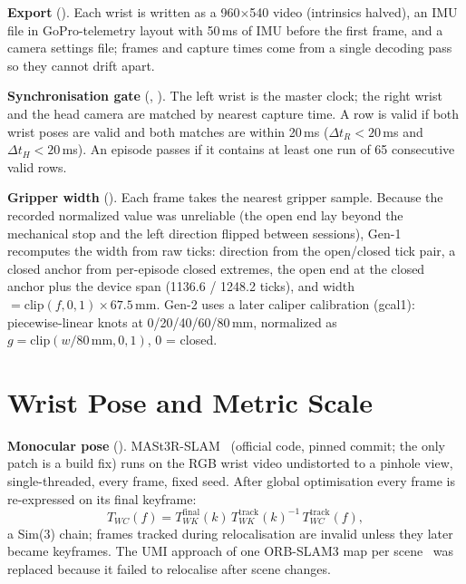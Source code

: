 \documentclass[conference,10pt]{IEEEtran}
\newcommand{\mm}{\,mm\xspace}
\begin{document}
\textbf{Export} (). Each wrist is written as a 960$\times$540 video (intrinsics
halved), an IMU file in GoPro-telemetry layout with 50\,ms of IMU before the first frame, and a camera settings file; frames and
capture times come from a single decoding pass so they cannot drift apart.

\textbf{Synchronisation gate} (, ). The left wrist is the master
clock; the right wrist and the head camera are matched by nearest capture time. A row is valid if both wrist poses are valid and
both matches are within 20\,ms ($\Delta t_R<20$\,ms and $\Delta t_H<20$\,ms). An episode passes if it contains at
least one run of 65 consecutive valid rows.

\textbf{Gripper width} (). Each frame takes the nearest gripper sample. Because the recorded normalized value
was unreliable (the open end lay beyond the mechanical stop and the left direction flipped between sessions), Gen-1 recomputes
the width from raw ticks: direction from the open/closed tick pair, a closed anchor from per-episode closed extremes, the open end
at the closed anchor plus the device span (1136.6 / 1248.2 ticks), and width $= \mathrm{clip}(f,0,1)\times 67.5$\mm. Gen-2 uses a
later caliper calibration (gcal1): piecewise-linear knots at 0/20/40/60/80\mm, normalized as $g=\mathrm{clip}(w/80\,\text{mm},0,1)$,
0 = closed.

\section{Wrist Pose and Metric Scale}\label{sec:pose}
\textbf{Monocular pose} (). MASt3R-SLAM~\cite{murai2025mast3rslam} (official
code, pinned commit; the only patch is a build fix) runs on the RGB wrist video undistorted to a pinhole view, single-threaded,
every frame, fixed seed. After global optimisation every frame is re-expressed on its final keyframe:
\begin{equation}
T_{WC}(f) = T_{WK}^{\text{final}}(k)\,T_{WK}^{\text{track}}(k)^{-1}\,T_{WC}^{\text{track}}(f),
\end{equation}
a Sim(3) chain; frames tracked during relocalisation are invalid unless they later became keyframes. The UMI approach of one
ORB-SLAM3 map per scene~\cite{chi2024umi} was replaced because it failed to relocalise after scene changes.
\end{document}
